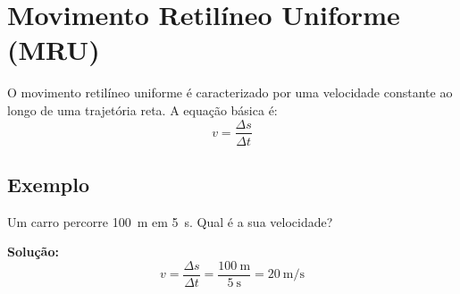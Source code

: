 \section{Movimento Retilíneo Uniforme (MRU)}
O movimento retilíneo uniforme é caracterizado por uma velocidade constante ao longo de uma trajetória reta. A equação básica é:
\begin{equation}
	v = \frac{\Delta s}{\Delta t}
\end{equation}

\subsection{Exemplo}
Um carro percorre \SI{100}{\meter} em \SI{5}{\second}. Qual é a sua velocidade? 

\textbf{Solução:}
\[
v = \frac{\Delta s}{\Delta t} = \frac{\SI{100}{\meter}}{\SI{5}{\second}} = \SI{20}{\meter\per\second}
\]


